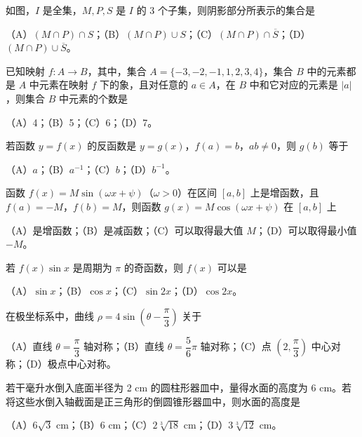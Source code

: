 \Needspace{0.4\textheight}
\begin{question}
如图，$I$ 是全集，$M,P,S$ 是 $I$ 的 3 个子集，则阴影部分所表示的集合是

（A）$(M\cap P)\cap S$；（B）$(M\cap P)\cup S$；（C）$(M\cap P)\cap\overline S$；（D）$(M\cap P)\cup\overline S$。
\nopagebreak[4]
\begin{center}\end{center}
\nopagebreak[4]
\end{question}
\begin{question}
已知映射 $f:A\to B$，其中，集合 $A=\{-3,-2,-1,1,2,3,4\}$，集合 $B$ 中的元素都是 $A$ 中元素在映射 $f$ 下的象，且对任意的 $a\in A$，在 $B$ 中和它对应的元素是 $|a|$，则集合 $B$ 中元素的个数是

（A）4；（B）5；（C）6；（D）7。

\end{question}
\begin{question}
若函数 $y=f(x)$ 的反函数是 $y=g(x)$，$f(a)=b$，$ab\ne0$，则 $g(b)$ 等于

（A）$a$；（B）$a^{-1}$；（C）$b$；（D）$b^{-1}$。

\end{question}
\begin{question}
函数 $f(x)=M\sin(\omega x+\psi)$（$\omega>0$）在区间 $[a,b]$ 上是增函数，且 $f(a)=-M$，$f(b)=M$，则函数 $g(x)=M\cos(\omega x+\psi)$ 在 $[a,b]$ 上

（A）是增函数；（B）是减函数；（C）可以取得最大值 $M$；（D）可以取得最小值 $-M$。

\end{question}
\begin{question}
若 $f(x)\sin x$ 是周期为 $\pi$ 的奇函数，则 $f(x)$ 可以是

（A）$\sin x$；（B）$\cos x$；（C）$\sin 2x$；（D）$\cos 2x$。

\end{question}
\begin{question}
在极坐标系中，曲线 $\rho=4\sin\left(\theta-\dfrac\pi3\right)$ 关于

（A）直线 $\theta=\dfrac\pi3$ 轴对称；（B）直线 $\theta=\dfrac56\pi$ 轴对称；（C）点 $\left(2,\dfrac\pi3\right)$ 中心对称；（D）极点中心对称。

\end{question}
\begin{question}
若干毫升水倒入底面半径为 2 cm 的圆柱形器皿中，量得水面的高度为 6 cm。若将这些水倒入轴截面是正三角形的倒圆锥形器皿中，则水面的高度是

（A）$6\sqrt3$ cm；（B）6 cm；（C）$2\sqrt[3]{18}$ cm；（D）$3\sqrt[3]{12}$ cm。

\end{question}
